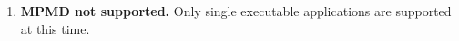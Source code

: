 %


\begin{enumerate}


\item {\bf MPMD not supported.}  Only single executable applications 
are supported at this time. 

\end{enumerate}
